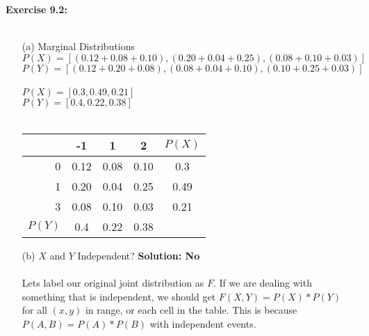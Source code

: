 \documentclass[11pt]{article}
\begin{document}
\textbf{Exercise 9.2:}
\\ \\
\begin{enumerate}
\item[(a)] Marginal Distributions
\\
$P(X) = [ (0.12 + 0.08 + 0.10), (0.20 + 0.04 + 0.25), (0.08 + 0.10 + 0.03)]$\\
$P(Y) = [ (0.12 + 0.20 + 0.08), (0.08 + 0.04 + 0.10), (0.10 + 0.25 + 0.03)]$\\
\\
{\Large
\textbf{$P(X) = [0.3, 0.49, 0.21]$}\\
\textbf{$P(Y) = [0.4, 0.22, 0.38]$}\\
}
\\
\begin{center}

  \begin{tabular}{ r || c | c | c || c |}
	 & -1 & 1 & 2 & $P(X)$\\ \hline
	 0 & 0.12 & 0.08 & 0.10 & 0.3 \\ \hline   
    1 & 0.20 & 0.04 & 0.25 & 0.49\\ \hline
    3 & 0.08 & 0.10 & 0.03 & 0.21\\ \hline \hline
	$P(Y)$ & 0.4 & 0.22 & 0.38
  \end{tabular}
\end{center}
\item[(b)] $X$ and $Y$ Independent?  \textbf{Solution: No}
\\ \\
Lets label our original joint distribution as $F$. If we are dealing with something that is independent, we should get $F(X, Y) = P(X) * P(Y)$ for all $(x, y)$ in range, or each cell in the table.  This is because $P(A, B) = P(A) * P(B)$ with independent events. \\


\end{enumerate}
\end{document}
